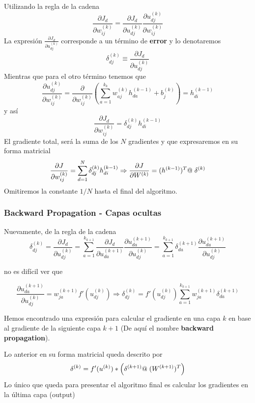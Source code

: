 Utilizando la regla de la cadena 
\[
\frac{\partial J_d}{\partial w_{ij}^{(k)}} = \frac{\partial J_d}{\partial u_{dj}^{(k)}}\frac{\partial u_{dj}^{(k)}}{\partial w_{ij}^{(k)}}
\] 
La expresión $\frac{\partial J_d}{\partial u_{dj}^{(k)}}$ corresponde a un término de \textbf{error} y lo denotaremos \
\[
\delta_{dj}^{(k)} \equiv \frac{\partial J_d}{\partial u_{dj}^{(k)}}
\] 
Mientras que para el otro término tenemos que 
\[
\frac{\partial u_{dj}^{(k)}}{\partial w_{ij}^{(k)}} = \frac{\partial}{\partial w_{ij}^{(k)}} \left ( \sum_{a = 1}^{k_k}w_{aj}^{(k)}h_{da}^{(k-1)} + b_j^{(k)} \right) = h_{di}^{(k-1)}
\] 
y así 
\[
\frac{\partial J_d}{\partial w_{ij}^{(k)}} = \delta_{dj}^{(k)}  h_{di}^{(k-1)}
\]
El gradiente total, será la suma de los $N$ gradientes y que expresaremos en su forma matricial
\begin{equation}
\frac{\partial J}{\partial w_{ij}^{(k)}} = \sum_{d=1}^N \delta_{dj}^{(k)}  h_{di}^{(k-1)}  \Rightarrow  \frac{\partial J}{\partial W^{(k)}} = (h^{(k-1)})^T @ \hspace{0.1cm} \delta^{(k)}
\end{equation}
Omitiremos la constante $1/N$ hasta el final del algoritmo.




\subsubsection{Backward Propagation - Capas ocultas}

Nuevamente, de la regla de la cadena
\[
\delta_{dj}^{(k)} = \frac{\partial J_d}{\partial u_{dj}^{(k)}} = \sum_{a=1}^{k_{k+1}} \frac{\partial J_d}{\partial u_{da}^{(k+1)}} \frac{\partial u_{da}^{(k+1)}}{\partial u_{dj}^{(k)}} = \sum_{a=1}^{k_{k+1}} \delta_{da}^{(k+1)} \frac{\partial u_{da}^{(k+1)}}{\partial u_{dj}^{(k)}}
\] 

no es difícil ver que

\[
\frac{\partial u_{da}^{(k+1)}}{\partial u_{dj}^{(k)}} = w_{ja}^{(k+1)}f'(u_{dj}^{(k)})  \Rightarrow  \delta_{dj}^{(k)} = f'(u_{dj}^{(k)})\sum_{a=1}^{k_{k+1}}w_{ja}^{(k+1)}\delta_{da}^{(k+1)}
\]

Hemos encontrado una expresión para calcular el gradiente en una capa $k$ en base al gradiente de la siguiente capa $k+1$ (De aquí el nombre \textbf{backward propagation}).
\newline 

Lo anterior en su forma matricial queda descrito por
\begin{equation}
\delta^{(k)} = f'(u^{(k)}) * \left ( \delta^{(k+1)} @ \hspace{0.1cm} (W^{(k+1)})^T \right )
\end{equation}
Lo único que queda para presentar el algoritmo final es calcular los gradientes en la última capa (output)


